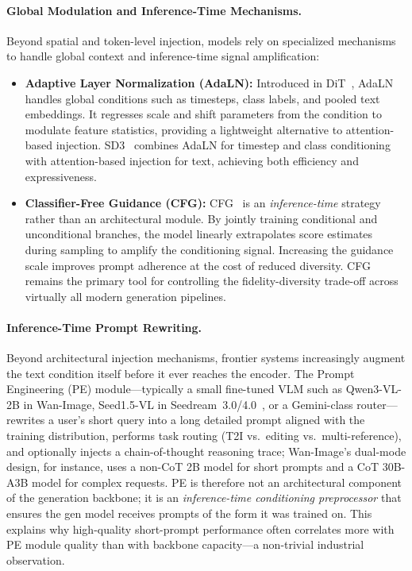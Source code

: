 \paragraph{Global Modulation and Inference-Time Mechanisms.}
Beyond spatial and token-level injection, models rely on specialized mechanisms to handle global context and inference-time signal amplification:
\begin{itemize}
    \item \textbf{Adaptive Layer Normalization (AdaLN):} Introduced in DiT~\citep{peebles2023scalable}, AdaLN handles global conditions such as timesteps, class labels, and pooled text embeddings. It regresses scale and shift parameters from the condition to modulate feature statistics, providing a lightweight alternative to attention-based injection. SD3~\citep{esser2024stablediffusion3} combines AdaLN for timestep and class conditioning with attention-based injection for text, achieving both efficiency and expressiveness.
    \item \textbf{Classifier-Free Guidance (CFG):} CFG~\citep{ho2022classifier} is an \emph{inference-time} strategy rather than an architectural module. By jointly training conditional and unconditional branches, the model linearly extrapolates score estimates during sampling to amplify the conditioning signal. Increasing the guidance scale improves prompt adherence at the cost of reduced diversity. CFG remains the primary tool for controlling the fidelity-diversity trade-off across virtually all modern generation pipelines.
\end{itemize}

\paragraph{Inference-Time Prompt Rewriting.} Beyond architectural injection mechanisms, frontier systems increasingly augment the text condition itself before it ever reaches the encoder. The Prompt Engineering (PE) module---typically a small fine-tuned VLM such as Qwen3-VL-2B in Wan-Image, Seed1.5-VL in Seedream~3.0/4.0~\citep{gao2025seedream,seedream2025seedream}, or a Gemini-class router---rewrites a user's short query into a long detailed prompt aligned with the training distribution, performs task routing (T2I vs.\ editing vs.\ multi-reference), and optionally injects a chain-of-thought reasoning trace; Wan-Image's dual-mode design, for instance, uses a non-CoT 2B model for short prompts and a CoT 30B-A3B model for complex requests. PE is therefore not an architectural component of the generation backbone; it is an \emph{inference-time conditioning preprocessor} that ensures the gen model receives prompts of the form it was trained on. This explains why high-quality short-prompt performance often correlates more with PE module quality than with backbone capacity---a non-trivial industrial observation.

